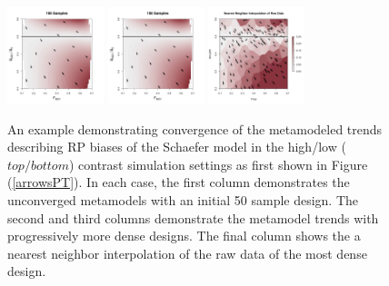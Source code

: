 \begin{figure}
\begin{center}
\includegraphics[width=0.25\textwidth]{../edits/directionalBiasSubPTFlatT30nF3.png}%
\includegraphics[width=0.25\textwidth]{../edits/directionalBiasSubPTFlatT30nF1.png}%
\includegraphics[width=0.25\textwidth]{../edits/obsDirectionalBiasSubFlatT30nF1.png}
\end{center}
\caption{ \label{edit2}
An example demonstrating convergence of the metamodeled trends describing RP biases of 
the Schaefer model in the high/low ($top/bottom$) contrast simulation settings as first 
shown in Figure (\ref{arrowsPT}). In each case, %
the first column demonstrates the unconverged metamodels with an initial 50 sample design. %
The second and third columns demonstrate the metamodel trends with progressively more dense designs. 
The final column shows the a nearest neighbor interpolation of the raw data of the most dense design.
}
\end{figure} 


